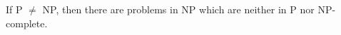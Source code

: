 \documentclass[letterpaper,11pt]{article}
\begin{document}
\begin{thm} If P $\ne$ NP, then there are problems in NP which are neither in P nor NP-complete.
\end{thm}

\begin{comment}
In order to find a subclass of NP which avoids Ladner's Theorem, Feder and Vardi used a result of Fagin \cite{fagin-snp} which showed an equivalence between problems in NP and problems in finitary existential second order logic. I hope I can state these results correctly, as I'm not very familiar with the ``strict NP'' point of view.

\begin{thm}[Fagin \cite{fagin-snp}] A set $S$ of finite models of a language $\mathcal{L}$ is in NP if and only if there exists a first order sentence $\phi$ in a language $\mathcal{L}'$ containing $\mathcal{L}$ such that $S = \{M \mid \exists R_1, ..., R_k\ (M, R_1, ..., R_k) \models \phi,\ |M| < \infty\}$, where $R_1, ..., R_k$ are the new function and relation symbols of $\mathcal{L}'$.
\end{thm}

\begin{defn} A set of finite models of a relational language $\mathcal{L}$ is in \emph{SNP} if it can be characterized by a second order logic formula $\varphi$ of the form $\exists R_1, ..., R_k \forall x_1, ..., x_n \phi$, where $R_1, ..., R_k$ are relations and $\phi$ is quantifier-free. The formula $\varphi$ is called \emph{monadic} if each relation $R_i$ is unary, $\varphi$ is called \emph{monotone} if each relation of $\mathcal{L}$ appears in the formula $\phi$ only negatively, and we say that $\varphi$ is \emph{without inequality} if the formula $\phi$ has no negative occurences of $\ne$ (or positive occurences of $=$). We say that a set of finite models of a relational language is in MMSNP if it can be characterized by a second order existential formula $\varphi$ as above which is monotone, monadic, and without inequality.
\end{defn}

Feder and Vardi \cite{feder-vardi} showed that for any two of ``monotone'', ``monadic'', and ``without inequality'', if one restricts to the subclass of SNP defined by formulas satisfying these two properties, one can find a polynomially equivalent problem in this subclass to any problem in NP, so Ladner's Theorem still applies. This motivated the restriction to MMSNP. Using randomized constructions of hypergraphs of large girth, Feder and Vardi then showed that problems in MMSNP are equivalent to constraint satisfaction problems.
\end{comment}
\end{document}
